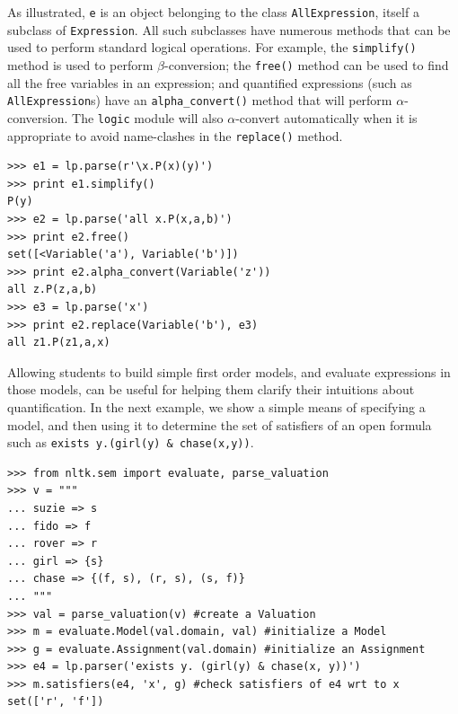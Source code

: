 \documentclass[11pt]{article}
\newcommand{\dhgcode}[1]{{\tt #1}}
\begin{document}
As illustrated, \texttt{e} is an object belonging to the class
\texttt{AllExpression}, itself a subclass of \texttt{Expression}.  All
such subclasses have numerous methods that can be used to perform
standard logical operations. For example, the \dhgcode{simplify()}
method is used to perform $\beta$-conversion; the \dhgcode{free()}
method can be used to find all the free variables in an expression;
and quantified expressions (such as \texttt{AllExpression}s) have an
\dhgcode{alpha\_convert()} method that will perform
$\alpha$-conversion.  The \texttt{logic} module will also $\alpha$-convert
automatically when it is appropriate to avoid name-clashes in the
\dhgcode{replace()} method.

\begin{verbatim}
>>> e1 = lp.parse(r'\x.P(x)(y)')
>>> print e1.simplify()
P(y)
>>> e2 = lp.parse('all x.P(x,a,b)')
>>> print e2.free()
set([<Variable('a'), Variable('b')])
>>> print e2.alpha_convert(Variable('z'))
all z.P(z,a,b)
>>> e3 = lp.parse('x')
>>> print e2.replace(Variable('b'), e3)
all z1.P(z1,a,x)
\end{verbatim}



Allowing students to build simple first order models, and evaluate
expressions in those models, can be useful for helping them clarify
their intuitions about quantification. In the next example, we show a
simple means of specifying a model, and then using it to determine the
set of satisfiers of an open formula such as
\verb!exists y.(girl(y) & chase(x,y))!.
\begin{verbatim}
>>> from nltk.sem import evaluate, parse_valuation
>>> v = """
... suzie => s
... fido => f
... rover => r
... girl => {s}
... chase => {(f, s), (r, s), (s, f)}
... """
>>> val = parse_valuation(v) #create a Valuation
>>> m = evaluate.Model(val.domain, val) #initialize a Model
>>> g = evaluate.Assignment(val.domain) #initialize an Assignment
>>> e4 = lp.parser('exists y. (girl(y) & chase(x, y))')
>>> m.satisfiers(e4, 'x', g) #check satisfiers of e4 wrt to x
set(['r', 'f'])
\end{verbatim}
\end{document}
